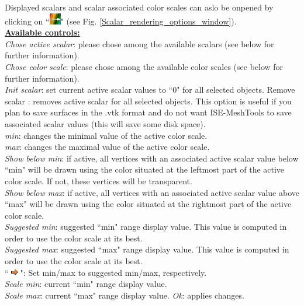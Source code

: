 Displayed scalars and scalar associated
color scales can aslo be onpened by
clicking on ``\includegraphics[scale=0.7]{images/pixmap/edit_color_scale.png}" (see Fig. \ref{Scalar_rendering_options_window}).\\
\noindent
\textbf{\underline{Available controls:}}\\
\textit{Chose active scalar}: please chose among
the available scalars (see below for further
information).\\
\textit{Chose color scale}: please chose among
the available color scales (see below for
further information).\\


\textit{Init scalar}: set current active scalar values to ``0" for all selected objects.
Remove scalar : removes active scalar for all selected objects. This option is useful if you plan to save surfaces in the .vtk format and do not want ISE-MeshTools to save associated scalar values (this will save some disk space).\\
\textit{min}: changes the minimal value of the active color scale.\\
\textit{max}: changes the maximal value of the active color scale.\\
\textit{Show below min}: if active, all vertices with an associated active scalar value below ``min" will be drawn using the color situated at the leftmost part of the active color scale. If not, these vertices will be transparent.\\
\textit{Show below max}: if active, all vertices with an associated active scalar value above ``max" will be drawn using the color situated at the rightmost part of the active color scale.\\
\textit{Suggested min}: suggested ``min" range display value. This value is computed in order to use the
color scale at its best.\\
\textit{Suggested max}: suggested ``max" range display value. This value is computed in order to use the
color scale at its best.\\
``\includegraphics[scale=0.7]{images/pixmap/s_right_132.png}": Set min/max to suggested min/max, respectively.\\
\textit{Scale min}: current ``min" range display value.\\
\textit{Scale max}: current ``max" range display value.
\textit{Ok}: applies changes.


